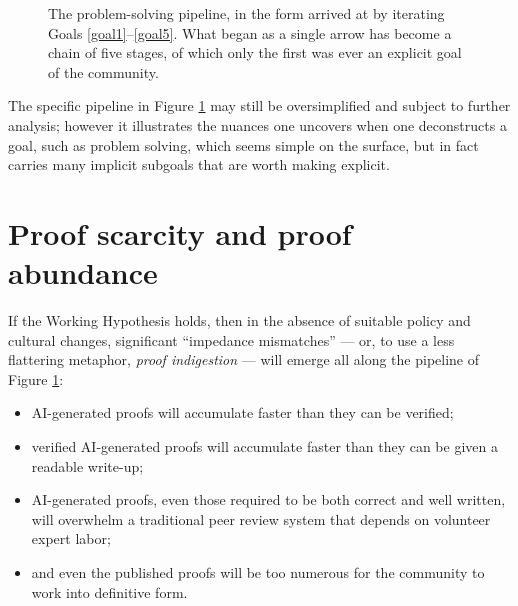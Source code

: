 \documentclass[12pt]{amsart}
\theoremstyle{definition}
\begin{document}
\begin{figure}[h]
\centering
{}
\caption{The problem-solving pipeline, in the form arrived at by iterating Goals \ref{goal1}--\ref{goal5}.  What began as a single arrow has become a chain of five stages, of which only the first was ever an explicit goal of the community.}\label{pipeline}
\end{figure}

The specific pipeline in Figure \ref{pipeline} may still be oversimplified and subject to further analysis; however it illustrates the nuances one uncovers when one deconstructs a goal, such as problem solving, which seems simple on the surface, but in fact carries many implicit subgoals that are worth making explicit.

\section{Proof scarcity and proof abundance}

If the Working Hypothesis holds, then in the absence of suitable policy and cultural changes, significant ``impedance mismatches'' --- or, to use a less flattering metaphor, \emph{proof indigestion} --- will emerge all along the pipeline of Figure \ref{pipeline}:

\begin{itemize}
\item AI-generated proofs will accumulate faster than they can be verified;
\item verified AI-generated proofs will accumulate faster than they can be given a readable write-up;
\item AI-generated proofs, even those required to be both correct and well written, will overwhelm a traditional peer review system that depends on volunteer expert labor;
\item and even the published proofs will be too numerous for the community to work into definitive form.
\end{itemize}
\end{document}
